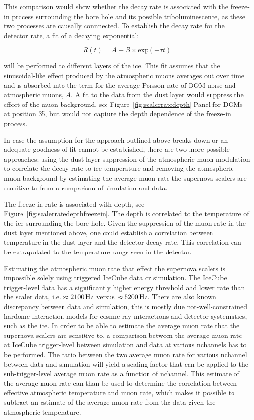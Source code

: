 This comparison would show whether the decay rate is associated with the freeze-in process surrounding the bore hole and its possible triboluminescence, as these two processes are causally connnected. To establish the decay rate for the detector rate, a fit of a decaying exponential:

\begin{equation}
  R(t) = A + B \times \textrm{exp}\left( -\tau t \right)   
\end{equation} 

\noindent will be performed to different layers of the ice. This fit assumes that the sinusoidal-like effect produced by the atmospheric muons averages out over time and is absorbed into the term for the average Poisson rate of DOM noise and atmospheric muons, $A$. A fit to the data from the dust layer would suppress the effect of the muon background, see Figure~\ref{fig:scalerratedepth} Panel for DOMs at position 35, but would not capture the depth dependence of the freeze-in process. 

In case the assumption for the approach outlined above breaks down or an adequate goodness-of-fit cannot be established, there are two more possible approaches: using the dust layer suppression of the atmospheric muon modulation to correlate the decay rate to ice temperature and removing the atmospheric muon background by estimating the average muon rate the supernova scalers are sensitive to from a comparison of simulation and data. 

The freeze-in rate is associated with depth, see Figure~\ref{fig:scalerratedepthfreezein}. The depth is correlated to the temperature of the ice surrounding the bore hole. Given the suppression of the muon rate in the dust layer mentioned above, one could establish a correlation between temperature in the dust layer and the detector decay rate. This correlation can be extrapolated to the temperature range seen in the detector.

Estimating the atmospheric muon rate that effect the supernova scalers is impossible solely using triggered IceCube data or simulation. The IceCube trigger-level data has a significantly higher energy threshold and lower rate than the scaler data, i.e. $\approx \unit[2100]{Hz}$ versus $\approx \unit[5200]{Hz}$. There are also known discrepancy between data and simulation, this is mostly due not-well-constrained hardonic interaction models for cosmic ray interactions and detector systematics, such as the ice. In order to be able to estimate the average muon rate that the supernova scalers are sensitive to, a comparison between the average muon rate at IceCube trigger-level between simulation and data at various nchannels has to be performed. The ratio between the two average muon rate for various nchannel between data and simulation will yield a scaling factor that can be applied to the sub-trigger-level average muon rate as a function of nchannel. This estimate of the average muon rate can than be used to determine the correlation between effective atmospheric temperature and muon rate, which makes it possible to subtract an estimate of the average muon rate from the data given the atmospheric temperature.

